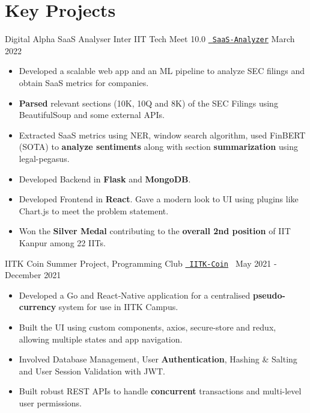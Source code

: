 \section*{\sc Key Projects}
\vspace{-2mm}
\hrulefill
\vspace{1mm}

\cventry
{Digital Alpha SaaS Analyser}
{Inter IIT Tech Meet 10.0}
{\texttt{\href{https://docs.google.com/presentation/d/1zgRrYwIt0juemg0FGrPXUjsLX2gD7f9wmv1iU7j4Gxo/edit?usp=sharing}{\faLink{} SaaS-Analyzer}}}
{March 2022}
{
\begin{itemize}
  \item Developed a scalable web app and an ML pipeline to analyze SEC filings and obtain SaaS metrics for companies.
  \item \textbf{Parsed} relevant sections (10K, 10Q and 8K) of the SEC Filings using BeautifulSoup and some external APIs.
  \item Extracted SaaS metrics using NER, window search algorithm, used FinBERT (SOTA) to \textbf{analyze sentiments} along with section \textbf{summarization} using legal-pegasus.
  \item Developed Backend in \textbf{Flask} and \textbf{MongoDB}.
  \item Developed Frontend in \textbf{React}. Gave a modern look to UI using plugins like Chart.js to meet the problem statement.
  \item Won the \textbf{Silver Medal} contributing to the \textbf{overall 2nd position} of IIT Kanpur among 22 IITs.
\end{itemize}
  }
\cventry
  {IITK Coin}
  {Summer Project, Programming Club}
  {\texttt{\href{https://github.com/abhishekshree/iitk-coin}{\faGithub{}}} \texttt{\href{https://github.com/abhishekshree/iitk-coin-native-app}{\faGithub{} IITK-Coin} }}
  {May 2021 - December 2021}
  {
    \begin{itemize}
      \item Developed a Go and React‑Native application for a centralised \textbf{pseudo-currency} system for use in IITK Campus.
      \item Built the UI using custom components, axios, secure-store and redux, allowing multiple states and app navigation.
      \item Involved Database Management, User \textbf{Authentication}, Hashing \& Salting and User Session Validation with JWT.
      \item Built robust REST APIs to handle \textbf{concurrent} transactions and multi-level user permissions.
    \end{itemize}
  }
